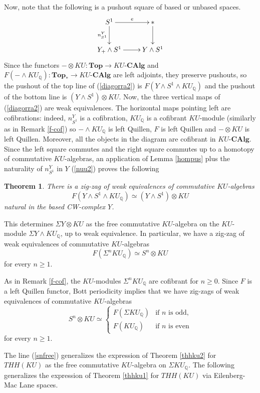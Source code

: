 \documentclass[a4paper,11pt]{amsart} %
\theoremstyle{definition} \newtheorem{defn}[equation]{Definition}
\theoremstyle{remark} \newtheorem{notation}[equation]{Notation}
\theoremstyle{plain} \newtheorem{teo}[equation]{Theorem}
\theoremstyle{plain} \newtheorem{lema}[equation]{Lemma}
\theoremstyle{plain} \newtheorem{prop}[equation]{Proposition}
\theoremstyle{plain} \newtheorem{corolario}[equation]{Corollary}
\theoremstyle{remark} \newtheorem{obs}[equation]{Remark}
\theoremstyle{remark} \newtheorem{sideobs}[equation]{Side remark}
\theoremstyle{remark} \newtheorem{ejercicio}[equation]{Exercise}
\theoremstyle{definition} \newtheorem{notn}[equation]{Notation}
\theoremstyle{remark} \newtheorem{ej}[equation]{Example}
\theoremstyle{remark} \newtheorem{contraej}[equation]{Counterexample}
\theoremstyle{plain} \newtheorem{conj}[equation]{Conjecture}
\renewcommand{\1}{\ensuremath{\mathbbm{1}}}
\newcommand{\Q}{\mathbb{Q}}
\newcommand{\bteo}{\begin{teo}}
\newcommand{\eteo}{\end{teo}}
\newcommand{\CAlg}{\mbox{-}\mathbf{CAlg}}
\newcommand{\Top}{\ensuremath{\mathbf{Top}}}
\numberwithin{equation}{section}
\begin{document}
Now, note that the following is a pushout square of based or unbased spaces. %
\[\xymatrix{S^1\ar[r]^-e \ar[d]_-{n^Y_{S^1}} & \ast \ar[d] \\ Y_+\wedge S^1 \ar[r] & Y\wedge S^1}\]
Since the functors $-\otimes KU:\Top\to KU\CAlg$ and $F(-\wedge KU_\Q):\Top_*\to KU\CAlg$ are left adjoints, they preserve pushouts, so the pushout of the top line of (\ref{diagorra2}) is $F(Y\wedge S^1\wedge KU_\Q)$ and the pushout of the bottom line is $(Y\wedge S^1) \otimes KU.$
%
%
%
%
%
Now, the three vertical maps of (\ref{diagorra2}) are weak equivalences. The horizontal maps pointing left are cofibrations: indeed, $n^Y_{S^1}$ is a cofibration, %
 $KU_\Q$ is a cofibrant $KU$-module (similarly as in Remark \ref{f-cof}) so $- \wedge KU_\Q$ is left Quillen, %
  $F$ is left Quillen and $-\otimes KU$ is left Quillen. Moreover, all the objects in the diagram are cofibrant in $KU\CAlg$. Since the left square commutes and the right square commutes up to a homotopy of commutative $KU$-algebras, an application of Lemma \ref{hompus} plus the naturality of $n^Y_{S^1}$ in $Y$ (\ref{nuu2}) proves the following
%
%
%
%
%
\bteo \label{xku}There is a zig-zag of weak equivalences of commutative $KU$-algebras \[F(Y\wedge S^1\wedge KU_\Q) \simeq (Y\wedge S^1)\otimes KU\]
natural in the based CW-complex $Y$.
\eteo

This determines $\Sigma Y\otimes KU$ as the free commutative $KU$-algebra on the $KU$-module $\Sigma Y \wedge KU_\Q$, up to weak equivalence. In particular, we have a zig-zag of weak equivalences of commutative $KU$-algebras
\begin{equation} \label{snfree} F(\Sigma^n KU_\Q) \simeq S^n \otimes KU\end{equation}
for every $n\geq 1$. %

As in Remark \ref{f-cof}, the $KU$-modules $\Sigma^n KU_\Q$ are cofibrant for $n\geq 0$. Since $F$ is a left Quillen functor, Bott periodicity implies that we have zig-zags of weak equivalences of commutative $KU$-algebras
\begin{equation}S^n\otimes KU \simeq \begin{cases} F(\Sigma KU_\Q) & \text{if } n \text{ is odd,} \\ F(KU_\Q) & \text{if } n \text{ is even} \end{cases}\end{equation}
for every $n\geq 1$.

The line (\ref{snfree}) generalizes the expression of Theorem \ref{thhku2} for $THH(KU)$ as the free commutative $KU$-algebra on $\Sigma KU_\Q$. The following generalizes the expression of Theorem \ref{thhku1} for $THH(KU)$ via Eilenberg-Mac Lane spaces.
\end{document}
